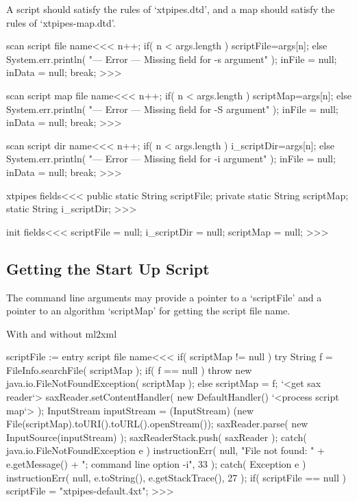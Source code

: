 \documentclass{article}
\begin{document}
{A script should satisfy  the rules of `xtpipes.dtd',
and a map should satisfy the rules of `xtpipes-map.dtd'.




\<scan script file name\><<<
n++;
if( n < args.length ){ scriptFile=args[n]; }
else {
  System.err.println(
      "--- Error --- Missing field for -s argument" );
  inFile = null; inData = null;  break;
}
>>>


\<scan script map file name\><<<
n++;
if( n < args.length ){ scriptMap=args[n]; }
else {
  System.err.println(
      "--- Error --- Missing field for -S argument" );
  inFile = null; inData = null;  break;
}
>>>


\<scan script dir name\><<<
n++;
if( n < args.length ){
   i_scriptDir=args[n];
} else {
  System.err.println(
      "--- Error --- Missing field for -i argument" );
  inFile = null; inData = null; break;
}
>>>




\<xtpipes fields\><<<
public static String scriptFile;
private static String scriptMap;
static String i_scriptDir;
>>>


\<init fields\><<<
scriptFile = null;
i_scriptDir = null;
scriptMap = null;
>>>




\subsection{Getting the Start Up Script}

The command line arguments may provide a pointer to
a `scriptFile' and a pointer to an algorithm `scriptMap'
for getting the script file name.

With and without ml2xml

\<scriptFile := entry script file name\><<<
if( scriptMap != null ){
   try{
      String f = FileInfo.searchFile( scriptMap );
      if( f == null ){
         throw new java.io.FileNotFoundException( scriptMap );
      } else {
         scriptMap = f;
      }
      `<get sax reader`>
      saxReader.setContentHandler( new DefaultHandler(){
         `<process script map`>
        } );
      InputStream inputStream =
           (InputStream) (new File(scriptMap).toURI().toURL().openStream());
      saxReader.parse( new InputSource(inputStream) );
      saxReaderStack.push( saxReader );
   } catch( java.io.FileNotFoundException e ){
      instructionErr( null,
                      "File not found: " + e.getMessage()
                      + "; command line option -i",
                      33 );
   } catch( Exception e ){
      instructionErr( null, e.toString(), e.getStackTrace(), 27 );
   }
}
if( scriptFile == null ){
    scriptFile = "xtpipes-default.4xt";
}
>>>


}
\end{document}
